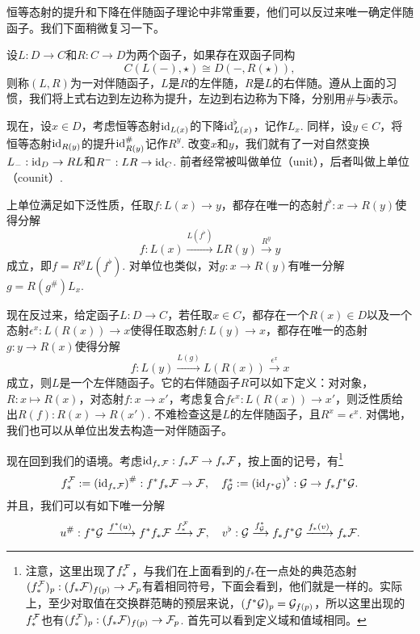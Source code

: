 恒等态射的提升和下降在伴随函子理论中非常重要，他们可以反过来唯一确定伴随函子。我们下面稍微复习一下。

\begin{para}[伴随函子]\label{adjoint_functor}
设$L:D\to C$和$R:C\to D$为两个函子，如果存在双函子同构
\[
	C(L(-),\star)\cong D(-,R(\star)),
\]
则称$(L,R)$为一对伴随函子，$L$是$R$的左伴随，$R$是$L$的右伴随。遵从上面的习惯，我们将上式右边到左边称为提升，左边到右边称为下降，分别用$\#$与$\flat$表示。

现在，设$x\in D$，考虑恒等态射$\operatorname{id}_{L(x)}$的下降$\operatorname{id}_{L(x)}^\flat$，记作$L_x$. 同样，设$y\in C$，将恒等态射$\operatorname{id}_{R(y)}$的提升$\operatorname{id}_{R(y)}^\#$记作$R^y$. 改变$x$和$y$，我们就有了一对自然变换$L_-:\operatorname{id}_D\to RL$和$R^-:LR\to \operatorname{id}_C$. 前者经常被叫做单位（unit），后者叫做上单位（counit）. 

上单位满足如下泛性质，任取$f:L(x)\to y$，都存在唯一的态射$f^\flat:x\to R(y)$使得分解
\[
	f:L(x)\xrightarrow{L(f^\flat)}LR(y)\xrightarrow{R^y}y
\]
成立，即$f=R^yL(f^\flat)$. 对单位也类似，对$g:x\to R(y)$有唯一分解$g=R(g^\#)L_x$.

现在反过来，给定函子$L:D\to C$，若任取$x\in C$，都存在一个$R(x)\in D$以及一个态射$\epsilon^x:L(R(x))\to x$使得任取态射$f:L(y)\to x$，都存在唯一的态射$g:y\to R(x)$使得分解
\[
	f:L(y)\xrightarrow{L(g)}L(R(x))\xrightarrow{\epsilon^x}x
\]
成立，则$L$是一个左伴随函子。它的右伴随函子$R$可以如下定义：对对象，$R:x\mapsto R(x)$，对态射$f:x\to x'$，考虑复合$f\epsilon^x:L(R(x))\to x'$，则泛性质给出$R(f):R(x)\to R(x')$. 不难检查这是$L$的左伴随函子，且$R^x=\epsilon^x$. 对偶地，我们也可以从单位出发去构造一对伴随函子。
%
\end{para}

现在回到我们的语境。考虑$\operatorname{id}_{f_*\mathcal{F}}:f_*\mathcal{F}\to f_*\mathcal{F}$，按上面的记号，有\footnote{
	注意，这里出现了$f_*^{\mathcal{F}}$，与我们在上面看到的$f_*$在一点处的典范态射$(f_*^{\mathcal{F}})_p:(f_*\mathcal{F})_{f(p)}\to \mathcal{F}_p$有着相同符号，下面会看到，他们就是一样的。实际上，至少对取值在交换群范畴的预层来说，$(f^*\mathcal{G})_p=\mathcal{G}_{f(p)}$，所以这里出现的$f_*^{\mathcal{F}}$也有$(f_*^{\mathcal{F}})_p:(f_*\mathcal{F})_{f(p)}\to \mathcal{F}_p$. 首先可以看到定义域和值域相同。
}
\[
	f_*^{\mathcal{F}}:=\left(\operatorname{id}_{f_*\mathcal{F}}\right)^\#: f^*f_*\mathcal{F} \to \mathcal{F}, \quad 
	f^*_{\mathcal{G}}:=\left(\operatorname{id}_{f^*\mathcal{G}}\right)^\flat : \mathcal{G} \to f_*f^*\mathcal{G}.
\]
并且，我们可以有如下唯一分解
\[
	u^\# : f^*\mathcal{G} \xrightarrow{f^*(u)} f^*f_*\mathcal{F} \xrightarrow{f_*^{\mathcal{F}}}\mathcal{F},\quad 
	v^\flat : \mathcal{G} \xrightarrow{f^*_{\mathcal{G}}} f_*f^*\mathcal{G}\xrightarrow{f_*(v)} f_*\mathcal{F}.
\]


